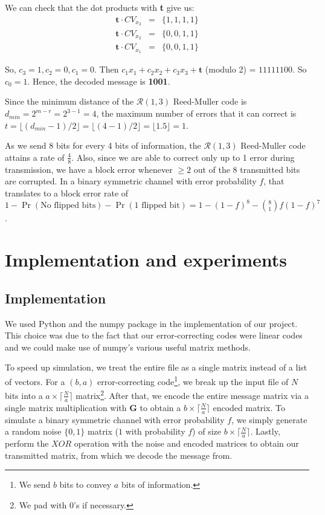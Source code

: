\documentclass[12pt, a4paper]{article}
\begin{document}
We can check that the dot products with \textbf{t} give us:
$$
\begin{array}{ccc}
\textbf{t} \cdot CV_{x_3} & = & \{1, 1, 1, 1\}\\
\textbf{t} \cdot CV_{x_2} & = & \{0, 0, 1, 1\}\\
\textbf{t} \cdot CV_{x_1} & = & \{0, 0, 1, 1\}
\end{array}
$$

So, $c_3 = 1, c_2 = 0, c_1 = 0$. Then $c_1x_1 + c_2x_2 + c_3x_3 + \textbf{t}$ (modulo 2) = $11111100$. So $c_0 = 1$. Hence, the decoded message is \textbf{1001}.

Since the minimum distance of the $\mathcal{R}(1,3)$ Reed-Muller code is $d_{min} = 2^{m-r} = 2^{3-1} = 4$, the maximum number of errors that it can correct is $t = \lfloor (d_{min}-1)/2 \rfloor = \lfloor (4-1)/2 \rfloor = \lfloor 1.5 \rfloor = 1$.

As we send 8 bits for every 4 bits of information, the $\mathcal{R}(1,3)$ Reed-Muller code attains a rate of $\frac{4}{8}$. Also, since we are able to correct only up to 1 error during transmission, we have a block error whenever $\geq 2$ out of the 8 transmitted bits are corrupted. In a binary symmetric channel with error probability $f$, that translates to a block error rate of $1 - \Pr(\text{No flipped bits}) - \Pr(\text{1 flipped bit}) = 1 - (1-f)^8 - \binom{8}{1}f(1-f)^7$.

\section{Implementation and experiments}
\subsection{Implementation}
We used Python and the numpy package in the implementation of our project. This choice was due to the fact that our error-correcting codes were linear codes and we could make use of numpy's various useful matrix methods.

To speed up simulation, we treat the entire file as a single matrix instead of a list of vectors. For a $(b, a)$ error-correcting code\footnote{We send $b$ bits to convey $a$ bits of information.}, we break up the input file of $N$ bits into a $a \times \lceil \frac{N}{a} \rceil$ matrix\footnote{We pad with 0's if necessary.}. After that, we encode the entire message matrix via a single matrix multiplication with \textbf{G} to obtain a $b \times \lceil \frac{N}{a} \rceil$ encoded matrix. To simulate a binary symmetric channel with error probability $f$, we simply generate a random noise $\{0,1\}$ matrix ($1$ with probability $f$) of size $b \times \lceil \frac{N}{a} \rceil$. Lastly, perform the $XOR$ operation with the noise and encoded matrices to obtain our transmitted matrix, from which we decode the message from.
\end{document}
